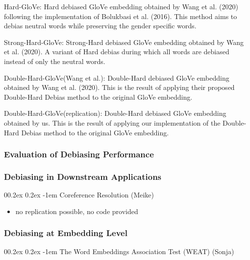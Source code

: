 \documentclass[
  english,
  man,floatsintext]{apa6}
\makeatletter
\providecommand{\tightlist}{%
  \setlength{\itemsep}{0pt}\setlength{\parskip}{0pt}}
\let\oldparagraph\paragraph
\renewcommand{\paragraph}[1]{\oldparagraph{#1}\mbox{}}
\renewcommand{\paragraph}{\@startsection{paragraph}{4}{\parindent}%
  {0\baselineskip \@plus 0.2ex \@minus 0.2ex}%
  {-1em}%
  {\normalfont\normalsize\bfseries\itshape\typesectitle}}
\makeatother
\begin{document}
Hard-GloVe: Hard debiased GloVe embedding obtained by Wang et al. (2020) following the implementation of Bolukbasi et al. (2016). This method aims to debias neutral words while preserving the gender specific words.

Strong-Hard-GloVe: Strong-Hard debiased GloVe embedding obtained by Wang et al. (2020). A variant of Hard debias during which all words are debiased instead of only the neutral words.

Double-Hard-GloVe(Wang et al.): Double-Hard debiased GloVe embedding obtained by Wang et al. (2020). This is the result of applying their proposed Double-Hard Debias method to the original GloVe embedding.

Double-Hard-GloVe(replication): Double-Hard debiased GloVe embedding obtained by us. This is the result of applying our implementation of the Double-Hard Debias method to the original GloVe embedding.

\hypertarget{evaluation-of-debiasing-performance}{%
\subsubsection{Evaluation of Debiasing Performance}\label{evaluation-of-debiasing-performance}}

\hypertarget{debiasing-in-downstream-applications}{%
\subsubsection{Debiasing in Downstream Applications}\label{debiasing-in-downstream-applications}}

\hypertarget{coreference-resolution-meike}{%
\paragraph{Coreference Resolution (Meike)}\label{coreference-resolution-meike}}

\begin{itemize}
\tightlist
\item
  no replication possible, no code provided
\end{itemize}

\hypertarget{debiasing-at-embedding-level}{%
\subsubsection{Debiasing at Embedding Level}\label{debiasing-at-embedding-level}}

\hypertarget{the-word-embeddings-association-test-weat-sonja}{%
\paragraph{The Word Embeddings Association Test (WEAT) (Sonja)}\label{the-word-embeddings-association-test-weat-sonja}}
\end{document}
